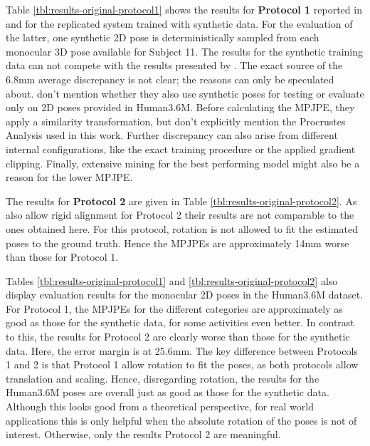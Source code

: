 



Table \ref{tbl:results-original-protocol1} shows the results for \textbf{Protocol 1} reported in \cite{drover18} and for the replicated system trained with synthetic data.
For the evaluation of the latter, one synthetic 2D pose is deterministically sampled from each monocular 3D pose available for Subject 11.
The results for the synthetic training data can not compete with the results presented by \citet{drover18}.
The exact source of the 6.8mm average discrepancy is not clear; the reasons can only be speculated about.
\citet{drover18} don't mention whether they also use synthetic poses for testing or evaluate only on 2D poses provided in Human3.6M.
Before calculating the MPJPE, they apply a similarity transformation, but don't explicitly mention the Procrustes Analysis used in this work.
Further discrepancy can also arise from different internal configurations, like the exact training procedure or the applied gradient clipping.
Finally, extensive mining for the best performing model might also be a reason for the lower MPJPE.

The results for \textbf{Protocol 2} are given in Table \ref{tbl:results-original-protocol2}.
As \citet{drover18} also allow rigid alignment for Protocol 2 their results are not comparable to the ones obtained here.
For this protocol, rotation is not allowed to fit the estimated poses to the ground truth.
Hence the MPJPEs are approximately 14mm worse than those for Protocol 1.

Tables \ref{tbl:results-original-protocol1} and \ref{tbl:results-original-protocol2} also display evaluation results for the monocular 2D poses in the Human3.6M dataset.
For Protocol 1, the MPJPEs for the different categories are approximately as good as those for the synthetic data, for some activities even better.
In contrast to this, the results for Protocol 2 are clearly worse than those for the synthetic data.
Here, the error margin is at 25.6mm.
The key difference between Protocols 1 and 2 is that Protocol 1 allow rotation to fit the poses, as both protocols allow translation and scaling.
Hence, disregarding rotation, the results for the Human3.6M poses are overall just as good as those for the synthetic data.
Although this looks good from a theoretical perspective, for real world applications this is only helpful when the absolute rotation of the poses is not of interest.
Otherwise, only the results Protocol 2 are meaningful.

